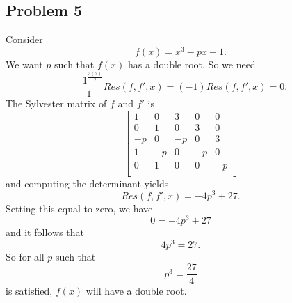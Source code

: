 \documentclass[12pt]{amsart}
\theoremstyle{case}
\begin{document}
	\subsection{Problem 5}
	Consider
	$$ f(x) = x^3 - px + 1 . $$
	We want $p$ such that $f(x)$ has a double root. So we need
	$$\frac{-1^\frac{3(2)}{2}}{1}Res(f,f',x) = (-1) Res(f,f',x) = 0 . $$
	The Sylvester matrix of $f$ and $f'$ is
	\[
	\begin{bmatrix}
	1 & 0 & 3 & 0 & 0\\
	0 & 1 & 0 & 3 & 0\\
	-p & 0 & -p & 0 & 3\\
	1 & -p & 0 & -p & 0\\
	0 & 1 & 0 & 0 & -p\\
	\end{bmatrix}
	\]
	and computing the determinant yields
	$$ Res(f,f',x) = -4p^3 + 27 . $$
	Setting this equal to zero, we have
	$$ 0 = -4p^3 + 27 $$
	and it follows that
	$$ 4p^3 = 27 . $$
	So for all $p$ such that
	$$ p^3 = \frac{27}{4}$$
	is satisfied, $f(x)$ will have a double root.
	
	
	
	
	
	
	
	
	
	
	
\end{document}
